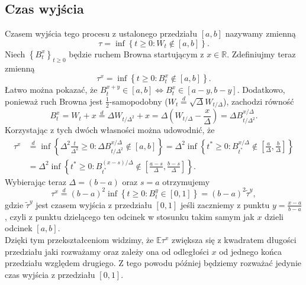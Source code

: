 \documentclass[12pt]{mwart}
\begin{document}
	\subsection{Czas wyjścia}
	\noindent Czasem wyjścia tego procesu z ustalonego przedziału $[a, b]$ nazywamy zmienną
	\begin{equation*}
		\tau=\inf\left\{t\geqslant0:W_t\notin[a, b]\right\}.
	\end{equation*}
	Niech $\left\{B^x_t\right\}_{t\geqslant0}$ będzie ruchem Browna startującym z $x\in\mathbb{R}$. Zdefiniujmy teraz zmienną 
	\begin{equation*}
		\tau^x=\inf\left\{t\geqslant0:B^x_t\notin[a, b]\right\}.
	\end{equation*}
	 Łatwo można pokazać, że $B^{x+y}_t\in[a ,b] \iff B^x_t\in[a-y, b-y]$.
	Dodatkowo, ponieważ ruch Browna jest $\frac{1}{2}$-samopodobny ($W_t\overset{d}{=}\sqrt{\Delta}W_{t/\Delta}$), zachodzi równość
	\begin{equation*}
		B^x_t=W_t+x\overset{d}{=}\Delta W_{t/\Delta^2}+x = \Delta\left(W_{t/\Delta}-\frac{x}{\Delta}\right)=\Delta B^{x/\Delta}_{t/\Delta^2}.
	\end{equation*}
	Korzystając z tych dwóch własności można udowodnić, że
	\begin{equation*}
		\begin{split}
			\tau^x&\overset{d}{=}\inf\left\{\Delta^2\frac{t}{\Delta^2}\geqslant0:\Delta B^{x/\Delta}_{t/\Delta^2}\notin[a, b]\right\} =\Delta^2\inf\left\{t^*\geqslant0:B^{x/\Delta}_{t^*}\notin\left[\frac{a}{\Delta},\frac{b}{\Delta}\right]\right\}\\
			&=\Delta^2\inf\left\{t^*\geqslant0:B^{(x-s)/\Delta}_{t^*}\notin\left[\frac{a-s}{\Delta},\frac{b-s}{\Delta}\right]\right\}.
		\end{split}
	\end{equation*}
	Wybierając teraz $\Delta=(b-a)$ oraz $s=a$ otrzymujemy
	\begin{equation*}\label{eq:tau_przeskalowane}
		\tau^x\overset{d}{=}(b-a)^2\inf\left\{t\geqslant0:B^y_t\in[0,1]\right\}=(b-a)^2\widetilde\tau^y,
	\end{equation*}
	gdzie $\widetilde\tau^y$ jest czasem wyjścia z przedziału $[0, 1]$ jeśli zaczniemy z punktu $y=\frac{x-a}{b-a}$, czyli z punktu dzielącego ten odcinek w stosunku takim samym jak $x$ dzieli odcinek $[a, b]$.\vspace{1.5mm}\\
	\noindent Dzięki tym przekształceniom widzimy, że $\mathbb{E}\tau^x$ zwiększa się z kwadratem długości przedziału jaki rozważamy oraz zależy ona od odległości $x$ od jednego końca przedziału względem drugiego. Z tego powodu później będziemy rozważać jedynie czas wyjścia z przedziału $[0, 1]$.
	
\end{document}
